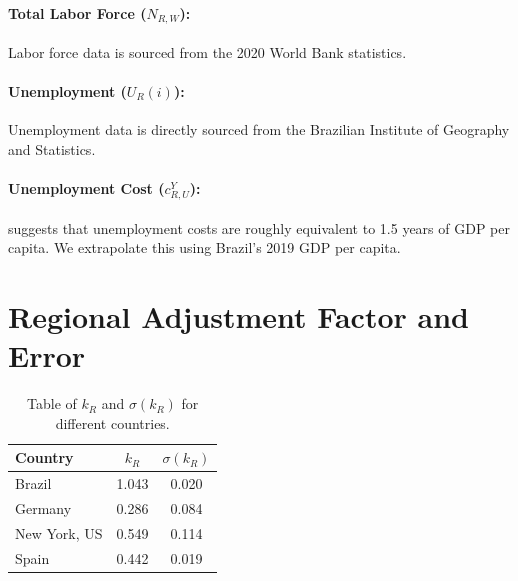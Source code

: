 \documentclass[msom,blindrev]{informs3} %
\begin{document}
\begin{APPENDICES}
\paragraph{Total Labor Force ($N_{R,W}$):} Labor force data is sourced from the 2020 World Bank statistics.

\paragraph{Unemployment ($U_R(i)$):} Unemployment data is directly sourced from the Brazilian Institute of Geography and Statistics.

\paragraph{Unemployment Cost ($c^Y_{R,U}$):}  suggests that unemployment costs are roughly equivalent to 1.5 years of GDP per capita. We extrapolate this using Brazil's 2019 GDP per capita.
\section{Regional Adjustment Factor and Error}
\label{app:adjustment_factor}
\begin{table}[h!]
\centering
\begin{tabular}{|l|c|c|}
\hline
\textbf{Country} & $k_R$ & $\sigma(k_R)$ \\ \hline
Brazil  & 1.043 & 0.020 \\ \hline
Germany & 0.286 & 0.084 \\ \hline
New York, US & 0.549 & 0.114 \\ \hline
Spain      & 0.442 & 0.019 \\ \hline
\end{tabular}
\caption{Table of $k_R$ and $\sigma(k_R)$ for different countries.}
\label{tab:kr_values}
\end{table}

\end{APPENDICES}
\end{document}
